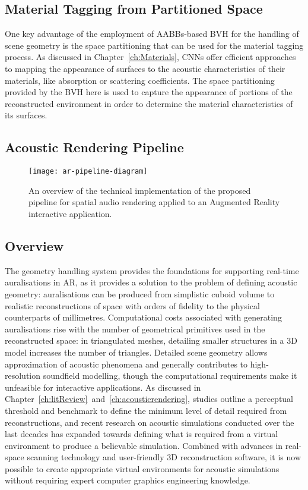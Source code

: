 \subsection{Material Tagging from Partitioned Space}
One key advantage of the employment of AABBs-based BVH for the handling of scene geometry is the space partitioning that can be used for the material tagging process. As discussed in Chapter~\ref{ch:Materials}, CNNs offer efficient approaches to mapping the appearance of surfaces to the acoustic characteristics of their materials, like absorption or scattering coefficients. The space partitioning provided by the BVH here is used to capture the appearance of portions of the reconstructed environment in order to determine the material characteristics of its surfaces.\par

\subsection{Acoustic Rendering Pipeline}
\begin{figure}[htb]
    \centering
    \texttt{[image: ar-pipeline-diagram]}
    \caption{An overview of the technical implementation of the proposed pipeline for spatial audio rendering applied to an Augmented Reality interactive application. }
    \label{fig:ar-pipeline-overview}
\end{figure}

\subsection{Overview}
The geometry handling system provides the foundations for supporting real-time auralisations in AR, as it provides a solution to the problem of defining acoustic geometry: auralisations can be produced from simplistic cuboid volume to realistic reconstructions of space with orders of fidelity to the physical counterparts of millimetres. Computational costs associated with generating auralisations rise with the number of geometrical primitives used in the reconstructed space: in triangulated meshes, detailing smaller structures in a 3D model increases the number of triangles. Detailed scene geometry allows approximation of acoustic phenomena and generally contributes to high-resolution soundfield modelling, though the computational requirements make it unfeasible for interactive applications. As discussed in Chapter~\ref{ch:litReview}~and~\ref{ch:acousticrendering}, studies outline a perceptual threshold and benchmark to define the minimum level of detail required from reconstructions, and recent research on acoustic simulations conducted over the last decades has expanded towards defining what is required from a virtual environment to produce a believable simulation. Combined with advances in real-space scanning technology and user-friendly 3D reconstruction software, it is now possible to create appropriate virtual environments for acoustic simulations without requiring expert computer graphics engineering knowledge.\par

